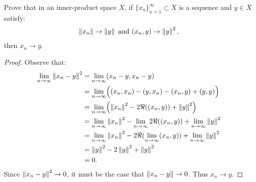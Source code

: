 \documentclass[10pt,oneside,openany]{memoir}
\begin{document}
\begin{exercise}
Prove that in an inner-product space $X$, if $\{x_n\}_{n = 1}^\infty \subset X$ is a sequence and $y \in X$ satisfy:
    \begin{equation*}
    \begin{split}
        \left\lVert x_n \right\rVert \rightarrow \left\lVert y \right\rVert \text{ and }(x_n,y) \rightarrow \left\lVert y \right\rVert^2,
    \end{split}
    \end{equation*}
then $x_n \rightarrow y$.
\end{exercise}
    \begin{proof}
        Observe that:
            \begin{equation*}
            \begin{split}
                \lim_{n \rightarrow \infty} \left\lVert x_n - y \right\rVert^2
                & = \lim_{n \rightarrow \infty} (x_n - y, x_n - y)\\
                & = \lim_{n \rightarrow \infty} \Bigl( (x_n,x_n) - (y,x_n) - (x_n,y) + (y,y) \Bigr) \\
                & = \lim_{n \rightarrow \infty} \Bigl(\left\lVert x_n \right\rVert^2 - 2\Re((x_n,y)) + \left\lVert y \right\rVert^2\Bigr) \\
                & = \lim_{n \rightarrow \infty} \left\lVert x_n \right\rVert^2 - \lim_{n \rightarrow \infty} 2\Re((x_n,y)) + \lim_{n \rightarrow \infty}\left\lVert y \right\rVert^2 \\
                & = \lim_{n \rightarrow \infty} \left\lVert x_n \right\rVert^2 -  2\Re(\lim_{n \rightarrow \infty}(x_n,y)) + \lim_{n \rightarrow \infty}\left\lVert y \right\rVert^2 \\
                & = \left\lVert y \right\rVert^2 - 2 \left\lVert y \right\rVert^2 + \left\lVert y \right\rVert^2 \\
                & = 0.
            \end{split}
            \end{equation*}
        Since $\left\lVert x_n - y \right\rVert^2 \rightarrow 0$, it must be the case that $\left\lVert x_n - y \right\rVert \rightarrow 0$. Thus $x_n \rightarrow y$.
    \end{proof}
\end{document}
